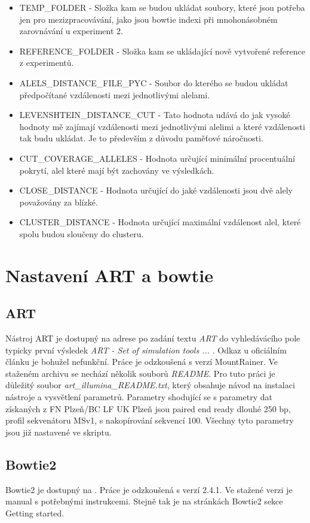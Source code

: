 \documentclass[czech,DP]{thesiskiv}
\numberwithin{equation}{section}
\begin{document}
\begin{itemize}
	\item TEMP\_FOLDER - Složka kam se budou ukládat soubory, které jsou potřeba jen pro mezizpracovávání, jako jsou bowtie indexi při mnohonásobném zarovnávání u experiment 2.
	\item REFERENCE\_FOLDER - Složka kam se ukládající nově vytvořené reference z experimentů.
	\item ALELS\_DISTANCE\_FILE\_PYC - Soubor do kterého se budou ukládat předpočítané vzdálenosti mezi jednotlivými alelami. 
	\item LEVENSHTEIN\_DISTANCE\_CUT - Tato hodnota udává do jak vysoké hodnoty mě zajímají vzdálenosti mezi jednotlivými alelimi a které vzdálenosti tak budu ukládat. Je to především z důvodu paměťové náročnosti.
	\item CUT\_COVERAGE\_ALLELES - Hodnota určující minimální procentuální pokrytí, alel které mají být zachovány ve výsledkách.
	 \item CLOSE\_DISTANCE - Hodnota určující do jaké vzdálenosti jsou dvě alely považovány za blízké.
	 \item CLUSTER\_DISTANCE - Hodnota určující maximální vzdálenost alel, které spolu budou sloučeny do clusteru.
\end{itemize}

\section{Nastavení ART a bowtie}
\subsection{ART}
Nástroj ART je dostupný na adrese \cite{art_download} po zadání textu \textit{ART} do vyhledávácího pole typicky první výsledek \textit{ART - Set of simulation tools ... }. Odkaz u oficiálním článku \cite{art} je bohužel nefunkční. Práce je odzkoušená s verzí MountRainer. Ve staženém archivu se nechází několik souborů \textit{README}. Pro tuto práci je důležitý soubor \textit{art\_illumina\_README.txt}, který obsahuje návod na instalaci nástroje a vysvětlení parametrů. Parametry shodující se s parametry dat získaných z FN Plzeň/BC LF UK Plzeň jsou paired end ready dlouhé 250 bp, profil sekvenátoru MSv1, s nakopírování sekvencí 100. Všechny tyto parametry jsou již nastavené ve skriptu.


\subsection{Bowtie2}
Bowtie2 je dostupný na \cite{bowtie2_download}. Práce je odzkoušená s verzí 2.4.1. Ve stažené verzi je manual s potřebnými instrukcemi. Stejně tak je na stránkách Bowtie2 sekce Getting started. 
\end{document}

